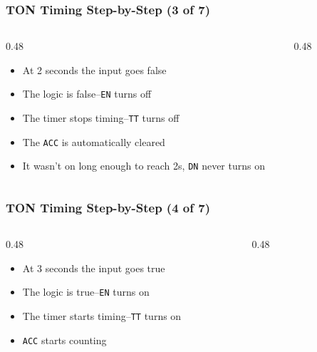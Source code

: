 \begin{frame}
    \frametitle{TON Timing Step-by-Step (3 of 7)}

    \begin{columns}
        \begin{column}{0.48\linewidth}
            \begin{itemize}
                \item At 2 seconds the input goes false
                \item The logic is false--\texttt{EN} turns off
                \item The timer stops timing--\texttt{TT} turns off
                \item The \texttt{ACC} is automatically cleared
                \item It wasn't on long enough to reach 2s, \texttt{DN} never turns on
            \end{itemize}
        \end{column}
        \begin{column}{0.48\linewidth}
            \begin{figure}
                \centering
                \resizebox{\columnwidth}{!}{
                    
                }
            \end{figure}  
        \end{column}
    \end{columns}
\end{frame}

\begin{frame}
    \frametitle{TON Timing Step-by-Step (4 of 7)}

    \begin{columns}
        \begin{column}{0.48\linewidth}
            \begin{itemize}
                \item At 3 seconds the input goes true
                \item The logic is true--\texttt{EN} turns on
                \item The timer starts timing--\texttt{TT} turns on
                \item \texttt{ACC} starts counting
            \end{itemize}
        \end{column}
        \begin{column}{0.48\linewidth}
            \begin{figure}
                \centering
                \resizebox{\columnwidth}{!}{
                    
                }
            \end{figure}  
        \end{column}
    \end{columns}
\end{frame}

